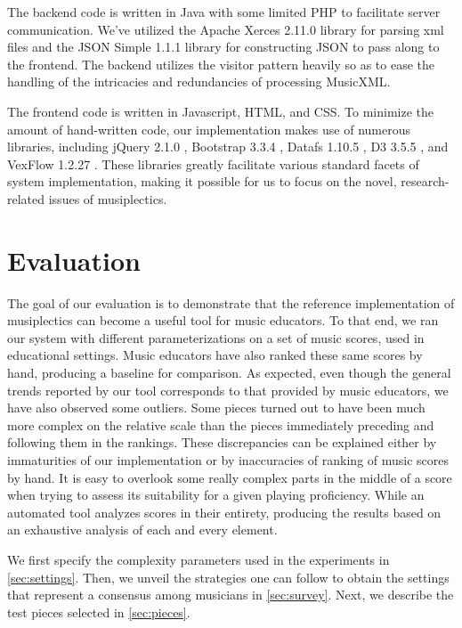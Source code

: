 \documentclass[10pt,preprint]{sigplanconf}
\begin{document}
The backend code is written in Java with some limited PHP to facilitate server communication. We've utilized the Apache Xerces 2.11.0 library for parsing xml files \cite{XMLAPI} and the JSON Simple 1.1.1 library \cite{JSONAPI} for constructing JSON to pass along to the frontend. The backend utilizes the visitor pattern heavily so as to ease the handling of the intricacies and redundancies of processing MusicXML.

The frontend code is written in Javascript, HTML, and CSS. To minimize the amount of hand-written code, our implementation makes use of numerous libraries, including jQuery 2.1.0 \cite{jQuery}, Bootstrap 3.3.4 \cite{Bootstrap}, Datafs 1.10.5 \cite{DataTables}, D3 3.5.5 \cite{D3}, and VexFlow 1.2.27 \cite{VexFlow}. These libraries greatly facilitate various standard facets of system implementation, making it possible for us to focus on the novel, research-related issues of musiplectics.


\section{Evaluation} 
\label{sec:eval}

The goal of our evaluation is to demonstrate that the reference implementation of musiplectics can become a useful tool for music educators. To that end, we ran our system with different parameterizations on a set of music scores, used in educational settings. Music educators have also ranked these same scores by hand, producing a baseline for comparison. As expected, even though the general trends reported by our tool corresponds to that provided by music educators, we have also observed some outliers. Some pieces turned out to have been much more complex on the relative scale than the pieces immediately preceding and following them in the rankings. These discrepancies can be explained either by immaturities of our implementation or by inaccuracies of ranking of music scores by hand. It is easy to overlook some really complex parts in the middle of a score when trying to assess its suitability for a given playing proficiency. While an automated tool analyzes scores in their entirety, producing the results based on an exhaustive analysis of each and every element.

We first specify the complexity parameters used in the experiments in \ref{sec:settings}. Then, we unveil the strategies one can follow to obtain the settings that represent a consensus among musicians in \ref{sec:survey}. Next, we describe the test pieces selected in \ref{sec:pieces}.  
\end{document}
